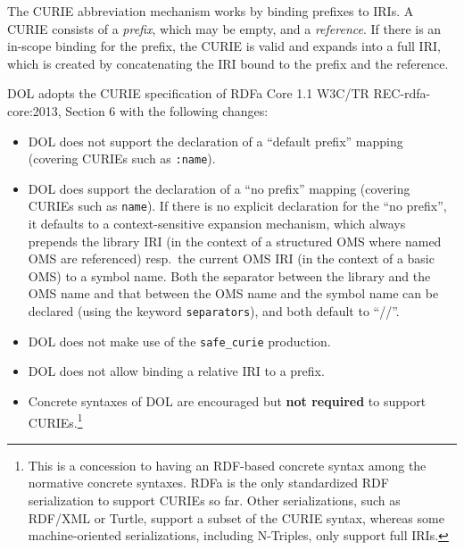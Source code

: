 \documentclass[10pt,fleqn,%
\ifpretendfinal
final%
\else
draft%
\fi,
]{scrreprt}
\makeatletter
\newcommand{\red}[1]{#1} %
\newcommand*\CommentAuthor{}
\renewcommand*\CommentAuthor{#1}}
\newcommand*\CommentDate{}
\renewcommand*\CommentDate{#1}}
\newcommand*\CommentId{}
\renewcommand*\CommentId{#1}}
\newcommand*\CommentType{}
\renewcommand*\CommentType{#1}}
\newcommand*{\SetCommentColorByType}[1]{%
\edef\localType{{#1}}%
\expandafter\ifstrequal\localType{q-aut}{\colorlet{CommentColor}{red}}{%
\expandafter\ifstrequal\localType{q-all}{\colorlet{CommentColor}{orange}}{%
\expandafter\ifstrequal\localType{todo}{\colorlet{CommentColor}{orange}}{%
\expandafter\ifstrequal\localType{fyi}{\colorlet{CommentColor}{lightgray}}{%
\colorlet{CommentColor}{yellow}}}}}}
\newcommand*{\SetCommentPrefixByType}[1]{%
\edef\localType{{#1}}%
\expandafter\@ifmtarg\localType{%
\edef\CommentPrefix{}%
}{%
\caseupper[q]{#1}%
\edef\CommentPrefix{\thestring: }%
}}
\newcommand*{\initComment}[1]{%
\setkeys{Comment}{#1}%
\SetCommentColorByType{\CommentType}%
\relax%
\SetCommentPrefixByType{\CommentType}%
\relax%
}
\newcommand*{\todonote}[2][]{%
\initComment{#1}%
\pdfcomment[author=\CommentAuthor,color=CommentColor,date=\CommentDate,id=\CommentId]{%
\CommentPrefix
#2}}
\renewcommand*{\todonote}[2][]{%
\initComment{#1}%
\ednote{\CommentPrefix #2}}
\newcommand*{\CLnote}[2][author=Christoph Lange]{%
\todonote[author=Christoph Lange,#1]{#2} 
}
\newcommand*{\syntax}[1]{\texttt{#1}}
\newcommand*{\notrequired}{\textbf{not required}\xspace}
\newcommand{\nisref}[1]{#1}
\makeatother
\begin{document}
The CURIE abbreviation mechanism works by binding prefixes to IRIs.  A CURIE consists of a 
\emph{prefix}, which may be empty, and a \emph{reference}.  If there is an in-scope binding for the 
prefix, the CURIE is valid and expands into a full IRI, which is created by concatenating the IRI 
bound to the prefix and the reference.

DOL adopts the CURIE specification of RDFa Core 1.1 \nisref{W3C/TR REC-rdfa-core:2013, Section 6} with the following changes:
\begin{itemize}
\item DOL does not support the declaration of a ``default prefix'' mapping %
(covering CURIEs such as \syntax{:name}).
\item DOL does support the declaration  of a ``no prefix'' mapping (covering CURIEs such as 
\syntax{name}). \red{If there is no explicit declaration for the ``no prefix'', it defaults to a 
context-sensitive expansion mechanism, which always prepends the library IRI (in the context of a 
structured OMS where named OMS are referenced) resp.\ the current OMS IRI (in the context of a basic
OMS) to a symbol name. Both the separator between the library and the OMS name and that between the 
OMS name and the symbol name can be declared (using the keyword \syntax{separators}), and both default to ``//''.}

\item DOL does not make use of the \syntax{safe\_curie} production.
\item DOL does not allow binding a relative IRI to a prefix.
\item Concrete syntaxes of DOL are encouraged but \notrequired to support CURIEs.\footnote{This is 
a concession to having an RDF-based concrete syntax among the normative concrete syntaxes.  RDFa is 
the only standardized RDF serialization to support CURIEs so far.  Other serializations, such as 
RDF/XML or Turtle, support a subset of the CURIE syntax, whereas some machine-oriented 
serializations, including N-Triples, only support full IRIs.}
\end{itemize}
\end{document}
